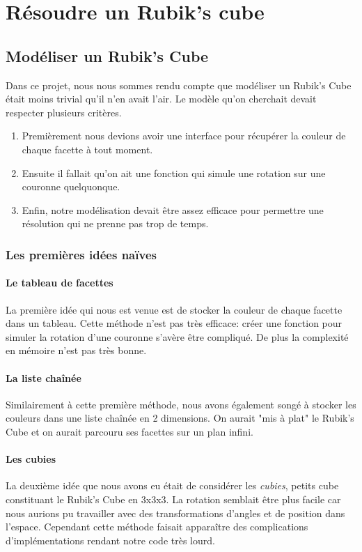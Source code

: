 \chapter{Résoudre un Rubik's cube}

\section{Modéliser un Rubik's Cube}

Dans ce projet, nous nous sommes rendu compte que modéliser un Rubik's Cube était moins trivial qu'il n'en avait l'air.
Le modèle qu'on cherchait devait respecter plusieurs critères. 
\begin{enumerate}
    \item Premièrement nous devions avoir une interface pour récupérer la couleur de chaque facette à tout moment.
    \item Ensuite il fallait qu'on ait une fonction qui simule une rotation sur une couronne quelquonque.
    \item Enfin, notre modélisation devait être assez efficace pour permettre une résolution qui ne prenne pas trop de temps.
\end{enumerate}
\subsection{Les premières idées naïves}

\subsubsection{Le tableau de facettes}
La première idée qui nous est venue est de stocker la couleur de chaque facette dans un tableau.
Cette méthode n'est pas très efficace: créer une fonction pour simuler la rotation d'une couronne s'avère être compliqué.
De plus la complexité en mémoire n'est pas très bonne.

\subsubsection{La liste chaînée}
Similairement à cette première méthode, nous avons également songé à stocker les couleurs dans une liste chaînée en 2 dimensions.
On aurait "mis à plat" le Rubik's Cube et on aurait parcouru ses facettes sur un plan infini.

\subsubsection{Les cubies}
La deuxième idée que nous avons eu était de considérer les \textit{cubies}, petits cube constituant le Rubik's Cube en 3x3x3.
La rotation semblait être plus facile car nous aurions pu travailler avec des transformations d'angles et de position dans l'espace.
Cependant cette méthode faisait apparaître des complications d'implémentations rendant notre code très lourd.

